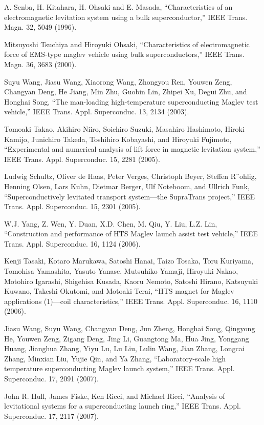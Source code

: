 \noindent [9.250] A. Senba, H. Kitahara, H. Ohsaki and E. Masada, ``Characteristics of an electromagnetic
levitation system using a bulk superconductor,” IEEE Trans. Magn.
32, 5049 (1996).

\noindent [9.251] Mitsuyoshi Tsuchiya and Hiroyuki Ohsaki, ``Characteristics of electromagnetic
force of EMS-type maglev vehicle using bulk superconductors,” IEEE Trans.
Magn. 36, 3683 (2000).

\noindent [9.252] Suyu Wang, Jiasu Wang, Xiaorong Wang, Zhongyou Ren, Youwen Zeng, Changyan
Deng, He Jiang, Min Zhu, Guobin Lin, Zhipei Xu, Degui Zhu, and Honghai
Song, ``The man-loading high-temperature superconducting Maglev test vehicle,”
IEEE Trans. Appl. Superconduc. 13, 2134 (2003).

\noindent [9.253] Tomoaki Takao, Akihiro Niiro, Soichiro Suzuki, Masahiro Hashimoto, Hiroki
Kamijo, Junichiro Takeda, Toshihiro Kobayashi, and Hiroyuki Fujimoto, ``Experimental
and numerical analysis of lift force in magnetic levitation system,”
IEEE Trans. Appl. Superconduc. 15, 2281 (2005).

\noindent [9.254] Ludwig Schultz, Oliver de Haas, Peter Verges, Christoph Beyer, Steffen R¨ohlig,
Henning Olsen, Lars Kuhn, Dietmar Berger, Ulf Noteboom, and Ullrich Funk,
``Superconductively levitated transport system—the SupraTrans project,” IEEE
Trans. Appl. Superconduc. 15, 2301 (2005).

\noindent [9.255] W.J. Yang, Z. Wen, Y. Duan, X.D. Chen, M. Qiu, Y. Liu, L.Z. Lin, ``Construction
and performance of HTS Maglev launch assist test vehicle,” IEEE Trans. Appl.
Superconduc. 16, 1124 (2006).

\noindent [9.256] Kenji Tasaki, Kotaro Marukawa, Satoshi Hanai, Taizo Tosaka, Toru Kuriyama,
Tomohisa Yamashita, Yasuto Yanase, Mutsuhiko Yamaji, Hiroyuki Nakao, Motohiro
Igarashi, Shigehisa Kusada, Kaoru Nemoto, Satoshi Hirano, Katsuyuki Kuwano,
Takeshi Okutomi, and Motoaki Terai, ``HTS magnet for Maglev applications
(1)—coil characteristics,” IEEE Trans. Appl. Superconduc. 16, 1110 (2006).

\noindent [9.257] Jiasu Wang, Suyu Wang, Changyan Deng, Jun Zheng, Honghai Song, Qingyong
He, Youwen Zeng, Zigang Deng, Jing Li, Guangtong Ma, Hua Jing, Yonggang
Huang, Jianghua Zhang, Yiyu Lu, Lu Liu, Lulin Wang, Jian Zhang, Longcai
Zhang, Minxian Liu, Yujie Qin, and Ya Zhang, ``Laboratory-scale high temperature
superconducting Maglev launch system,” IEEE Trans. Appl. Superconduc.
17, 2091 (2007).

\noindent [9.258] John R. Hull, James Fiske, Ken Ricci, and Michael Ricci, ``Analysis of levitational
systems for a superconducting launch ring,” IEEE Trans. Appl. Superconduc. 17,
2117 (2007).

